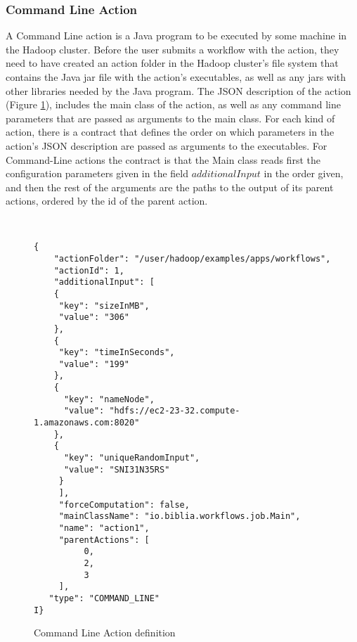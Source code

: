 \subsubsection{Command Line Action}
A Command Line action is a Java program to be executed by some machine in the Hadoop cluster.  Before the user submits a workflow with the action, they need to have created an action folder in the Hadoop cluster's file system that contains the Java jar file with the action's executables, as well as any jars with other libraries needed by the Java program.  The JSON description of the action (Figure \ref{fig:command_line_action_definition}), includes the main class of the action, as well as any command line parameters that are passed as arguments to the main class. For each kind of action, there is a contract that defines the order on which parameters in the action's JSON description are passed as arguments to the executables. For Command-Line actions the contract is that the Main class reads first the configuration parameters given in the field $additionalInput$ in the order given, and then the rest of the arguments are the paths to the output of its parent actions, ordered by the id of the parent action.
\begin{figure}
\begin{mdframed}
\begin{singlespace}
\begin{verbatim}


{
    "actionFolder": "/user/hadoop/examples/apps/workflows", 
    "actionId": 1, 
    "additionalInput": [
    {
     "key": "sizeInMB",
     "value": "306"
    }, 
    {
     "key": "timeInSeconds", 
     "value": "199"
    }, 
    {
      "key": "nameNode", 
      "value": "hdfs://ec2-23-32.compute-1.amazonaws.com:8020"
    }, 
    {
      "key": "uniqueRandomInput", 
      "value": "SNI31N35RS"
     }
     ], 
     "forceComputation": false, 
     "mainClassName": "io.biblia.workflows.job.Main", 
     "name": "action1", 
     "parentActions": [
          0, 
          2, 
          3
     ], 
   "type": "COMMAND_LINE"
I}
\end{verbatim}
\end{singlespace}
\end{mdframed}
\caption{Command Line Action definition}
\label{fig:command_line_action_definition}
\end{figure}

